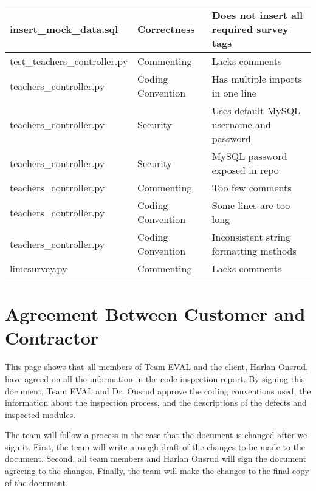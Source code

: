 \documentclass{article}
\begin{document}
\begin{center}
{\begin{tabular}{|p{4cm}|p{3cm}|p{6cm}|}
\hline
insert\_mock\_data.sql & Correctness & Does not insert all required survey tags\\ 
\hline
test\_teachers\_controller.py & Commenting & Lacks comments\\ 
\hline
teachers\_controller.py & Coding Convention & Has multiple imports in one line\\ 
\hline
teachers\_controller.py & Security & Uses default MySQL username and \newline password\\ 
\hline
teachers\_controller.py & Security & MySQL password exposed in repo\\ 
\hline
teachers\_controller.py & Commenting & Too few comments\\ 
\hline
teachers\_controller.py & Coding Convention & Some lines are too long\\ 
\hline
teachers\_controller.py & Coding Convention & Inconsistent string formatting methods \\ 
\hline
limesurvey.py & Commenting & Lacks comments \\ 
\hline
\end{tabular}}
\end{center}

\appendix

\newpage
\section{Agreement Between Customer and Contractor}
This page shows that all members of Team EVAL and the client, Harlan Onsrud, have agreed on all the information in the code inspection report. By signing this document, Team EVAL and Dr. Onsrud approve the coding conventions used, the information about the inspection process, and the descriptions of the defects and inspected modules.

The team will follow a process in the case that the document is changed after we sign it. First, the team will write a rough draft of the changes to be made to the document. Second, all team members and Harlan Onsrud will sign the document agreeing to the changes. Finally, the team will make the changes to the final copy of the document.
\end{document}
